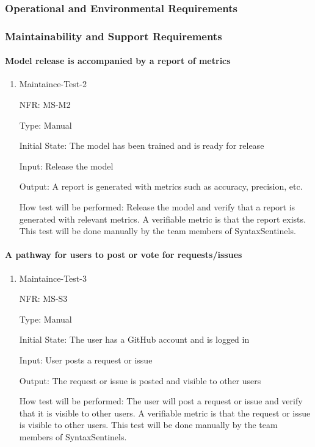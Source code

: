 \documentclass[12pt, titlepage]{article}
\begin{document}
\subsubsection{Operational and Environmental Requirements}

\subsubsection{Maintainability and Support Requirements}

\paragraph{Model release is accompanied by a report of metrics}

\begin{enumerate}

  \item{Maintaince-Test-2}

  NFR: MS-M2

  Type: Manual

  Initial State: The model has been trained and is ready for release

  Input: Release the model

  Output: A report is generated with metrics such as accuracy, precision, etc.

  How test will be performed:
  Release the model and verify that a report is generated with relevant metrics. A verifiable metric is that the report exists.
  This test will be done manually by the team members of SyntaxSentinels.

\end{enumerate}

\paragraph{A pathway for users to post or vote for requests/issues}

\begin{enumerate}
  \item{Maintaince-Test-3}

  NFR: MS-S3

  Type: Manual

  Initial State: The user has a GitHub account and is logged in

  Input: User posts a request or issue

  Output: The request or issue is posted and visible to other users

  How test will be performed:
  The user will post a request or issue and verify that it is visible to other users. A verifiable metric is that the request or issue is visible to other users.
  This test will be done manually by the team members of SyntaxSentinels.
\end{enumerate}
\end{document}
